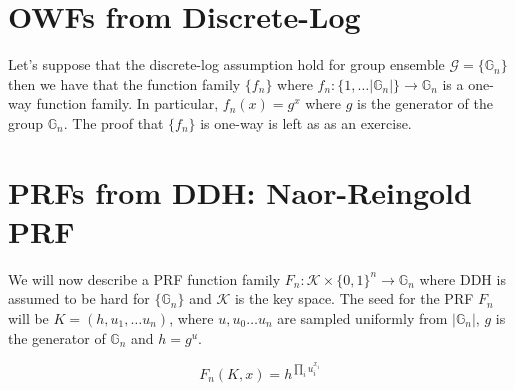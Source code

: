 \section{OWFs from Discrete-Log}
Let's suppose that the discrete-log assumption hold for group ensemble $\mathcal{G} = \{\mathbb{G}_n\}$ then we have that the function family $\{f_n\}$ where $f_n: \{1,\ldots |\mathbb{G}_n|\}\rightarrow \mathbb{G}_n$ is a one-way function family. In particular, $f_n(x) = g^x$ where $g$ is the generator of the group $\mathbb{G}_n$. The proof that $\{f_n\}$ is one-way is left as as an exercise. 


\section{PRFs from DDH: Naor-Reingold PRF}
We will now describe a PRF function family $F_n: \mathcal{K} \times \{0,1\}^n \rightarrow \mathbb{G}_n$ where DDH is assumed to be hard for  $\{\mathbb{G}_n\}$ and $\mathcal{K}$ is the key space.
The seed for the PRF $F_n$ will be $K =  (h, u_1, \ldots u_n)$, where $u,u_0\ldots u_n$ are sampled uniformly from $|\mathbb{G}_n|$, $g$ is the generator of $\mathbb{G}_n$ and $h = g^u$. 

\[F_n(K,x) = h^{\prod_{i} u_i^{x_i}}\]

